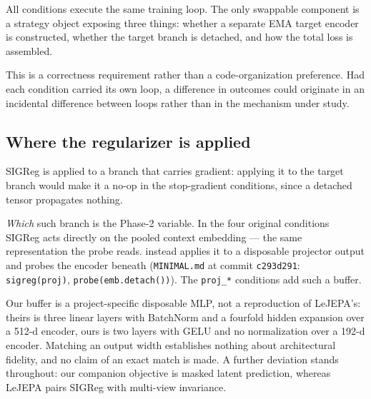 All conditions execute the same training loop. The only swappable component is a
strategy object exposing three things: whether a separate EMA target encoder is
constructed, whether the target branch is detached, and how the total loss is assembled.

This is a correctness requirement rather than a code-organization preference. Had each
condition carried its own loop, a difference in outcomes could originate in an incidental
difference between loops rather than in the mechanism under study.

\subsection{Where the regularizer is applied}

SIGReg is applied to a branch that carries gradient: applying it to the target branch would
make it a no-op in the stop-gradient conditions, since a detached tensor propagates nothing.

\emph{Which} such branch is the Phase-2 variable. In the four original conditions SIGReg
acts directly on the pooled context embedding --- the same representation the probe reads.
\citet{lejepa2025} instead applies it to a disposable projector output and probes the
encoder beneath (\texttt{MINIMAL.md} at commit \texttt{c293d291}: \texttt{sigreg(proj)},
\texttt{probe(emb.detach())}). The \texttt{proj\_*} conditions add such a buffer.

\interp{} Our buffer is a project-specific disposable MLP, not a reproduction of LeJEPA's:
theirs is three linear layers with BatchNorm and a fourfold hidden expansion over a 512-d
encoder, ours is two layers with GELU and no normalization over a 192-d encoder. Matching
an output width establishes nothing about architectural fidelity, and no claim of an exact
match is made. A further deviation stands throughout: our companion objective is masked
latent prediction, whereas LeJEPA pairs SIGReg with multi-view invariance.

